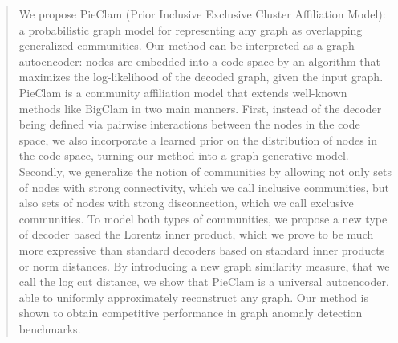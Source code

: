 \documentclass[letterpaper]{article} %
\begin{document}
\begin{abstract}
We propose PieClam (Prior Inclusive Exclusive Cluster Affiliation Model): a probabilistic graph model for representing any graph as overlapping  generalized communities.  Our method can be interpreted as a graph autoencoder: nodes are embedded into a code space by an algorithm that maximizes the log-likelihood of the decoded graph, given the input graph. PieClam is a community affiliation model that extends well-known methods like BigClam in two main manners. First, instead of the decoder being defined via pairwise interactions between the nodes in the code space, we also incorporate a learned prior on the distribution of nodes in the code space, turning our method into a graph generative model. Secondly, we generalize the notion of communities by allowing not only sets of nodes with strong connectivity, which we call inclusive communities, but also sets of nodes with strong disconnection, which we call exclusive communities.  To model both types of communities, we propose a new type of decoder based the Lorentz inner product, which we prove to be much more expressive than standard decoders based on standard inner products or norm distances. By introducing a new graph similarity measure, that we call the log cut distance, we show that PieClam is a universal autoencoder, able to uniformly approximately reconstruct any graph. Our method is shown to obtain competitive performance in graph anomaly detection benchmarks.





\end{abstract}
\end{document}

